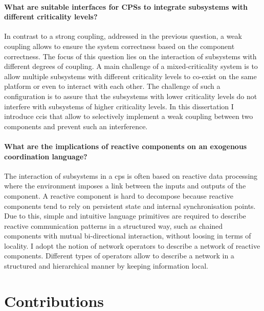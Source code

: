 \paragraph*{What are suitable interfaces for CPSs to integrate subsystems with different criticality levels?} \hfill

In contrast to a strong coupling, addressed in the previous question, a weak coupling allows to ensure the system correctness based on the component correctness.
The focus of this question lies on the interaction of subsystems with different degrees of coupling.
A main challenge of a mixed-criticality system is to allow multiple subsystems with different criticality levels to co-exist on the same platform or even to interact with each other.
The challenge of such a configuration is to assure that the subsystems with lower criticality levels do not interfere with subsystems of higher criticality levels.
In this dissertation I introduce \glspl{cci} that allow to selectively implement a weak coupling between two components and prevent such an interference.

\paragraph*{What are the implications of reactive components on an exogenous coordination language?} \hfill

The interaction of subsystems in a \gls{cps} is often based on reactive data processing where the environment imposes a link between the inputs and outputs of the component.
A reactive component is hard to decompose because reactive components tend to rely on persistent state and internal synchronisation points.
Due to this, simple and intuitive language primitives are required to describe reactive communication patterns in a structured way, such as chained components with mutual bi-directional interaction, without loosing in terms of locality.
I adopt the notion of network operators to describe a network of reactive components.
Different types of operators allow to describe a network in a structured and hierarchical manner by keeping information local.


\section{Contributions}
\label{sect_intro_contribution}

